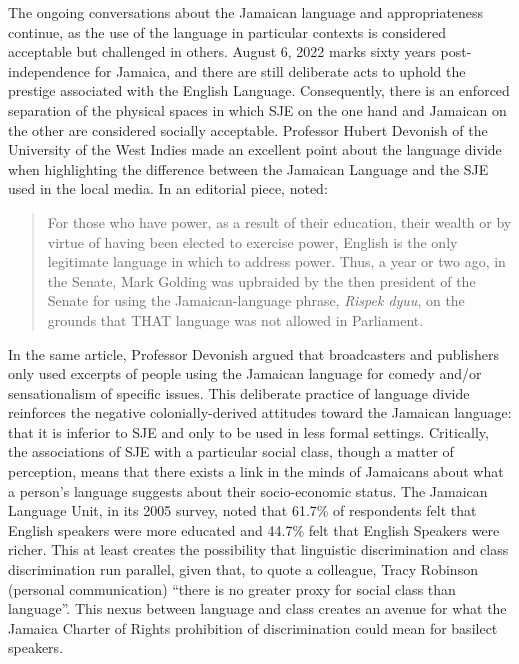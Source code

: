 \documentclass[output=paper,colorlinks,citecolor=brown]{langscibook}
\begin{document}
The ongoing conversations about the Jamaican language and appropriateness continue, as the use of the language in particular contexts is considered acceptable but challenged in others. August 6, 2022 marks sixty years post-indepen\-den\-ce for Jamaica, and there are still deliberate acts to uphold the prestige associated with the English Language. Consequently, there is an enforced separation of the physical spaces in which SJE on the one hand and Jamaican on the other are considered socially acceptable. Professor Hubert Devonish of the University of the West Indies made an excellent point about the language divide when highlighting the difference between the Jamaican Language and the SJE used in the local media. In an editorial piece, \citet{Devonish2014} noted:

\begin{quote}
    For those who have power, as a result of their education, their wealth or by virtue of having been elected to exercise power, English is the only legitimate language in which to address power. Thus, a year or two ago, in the Senate, Mark Golding was upbraided by the then president of the Senate for using the Jamaican-language phrase, \textit{Rispek dyuu}, on the grounds that THAT language was not allowed in Parliament.
\end{quote}

In the same article, Professor Devonish argued that broadcasters and publishers only used excerpts of people using the Jamaican language for comedy and/or sensationalism of specific issues. This deliberate practice of language divide reinforces the negative colonially-derived attitudes toward the Jamaican language: that it is inferior to SJE and only to be used in less formal settings. Critically, the associations of SJE with a particular social class, though a matter of perception, means that there exists a link in the minds of Jamaicans about what a person’s language suggests about their socio-economic status. The Jamaican Language Unit, in its 2005 survey, noted that 61.7\% of respondents felt that English speakers were more educated and 44.7\% felt that English Speakers were richer. This at least creates the possibility that linguistic discrimination and class discrimination run parallel, given that, to quote a colleague, Tracy Robinson (personal communication) “there is no greater proxy for social class than language”. This nexus between language and class creates an avenue for what the Jamaica Charter of Rights prohibition of discrimination could mean for basilect speakers.
\end{document}
